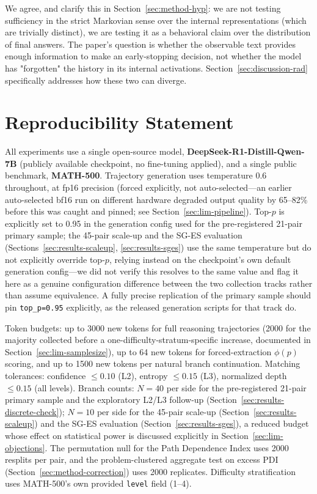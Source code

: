 \documentclass{article}
\begin{document}
We agree, and clarify this in Section~\ref{sec:method-hyp}: we are not testing sufficiency in the strict Markovian sense over the internal representations (which are trivially distinct), we are testing it as a behavioral claim over the distribution of final answers. The paper's question is whether the observable text provides enough information to make an early-stopping decision, not whether the model has "forgotten" the history in its internal activations. Section~\ref{sec:discussion-rad} specifically addresses how these two can diverge.

\section*{Reproducibility Statement}

All experiments use a single open-source model, \textbf{DeepSeek-R1-Distill-Qwen-7B} (publicly available checkpoint, no fine-tuning applied), and a single public benchmark, \textbf{MATH-500}. Trajectory generation uses temperature 0.6 throughout, at fp16 precision (forced explicitly, not auto-selected---an earlier auto-selected bf16 run on different hardware degraded output quality by 65--82\% before this was caught and pinned; see Section~\ref{sec:lim-pipeline}). Top-$p$ is explicitly set to 0.95 in the generation config used for the pre-registered 21-pair primary sample; the 45-pair scale-up and the SG-ES evaluation (Sections~\ref{sec:results-scaleup}, \ref{sec:results-sges}) use the same temperature but do not explicitly override top-$p$, relying instead on the checkpoint's own default generation config---we did not verify this resolves to the same value and flag it here as a genuine configuration difference between the two collection tracks rather than assume equivalence. A fully precise replication of the primary sample should pin \texttt{top\_p=0.95} explicitly, as the released generation scripts for that track do. 

Token budgets: up to 3000 new tokens for full reasoning trajectories (2000 for the majority collected before a one-difficulty-stratum-specific increase, documented in Section~\ref{sec:lim-samplesize}), up to 64 new tokens for forced-extraction $\phi(p)$ scoring, and up to 1500 new tokens per natural branch continuation. Matching tolerances: confidence $\le 0.10$ (L2), entropy $\le 0.15$ (L3), normalized depth $\le 0.15$ (all levels). Branch counts: $N=40$ per side for the pre-registered 21-pair primary sample and the exploratory L2/L3 follow-up (Section~\ref{sec:results-discrete-check}); $N=10$ per side for the 45-pair scale-up (Section~\ref{sec:results-scaleup}) and the SG-ES evaluation (Section~\ref{sec:results-sges}), a reduced budget whose effect on statistical power is discussed explicitly in Section~\ref{sec:lim-objections}. The permutation null for the Path Dependence Index uses 2000 resplits per pair, and the problem-clustered aggregate test on excess PDI (Section~\ref{sec:method-correction}) uses 2000 replicates. Difficulty stratification uses MATH-500's own provided \texttt{level} field (1--4).
\end{document}
